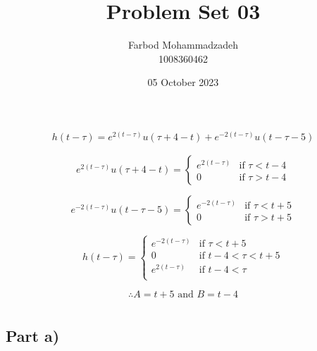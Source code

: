 \documentclass[20pt]{article}
\title{Problem Set 03}
\author{Farbod Mohammadzadeh\\
    1008360462}
\date{05 October 2023}
\begin{document}
\Large


\maketitle

\newpage

\section{}

\begin{align}
    h(t-\tau) = e^{2(t-\tau)} u(\tau+4-t) + e^{-2(t-\tau)} u(t-\tau - 5)
\end{align}

\begin{equation}
    e^{2(t-\tau)}u(\tau+4-t)=
    \begin{cases}
        e^{2(t-\tau)} & \text{if } \tau < t-4 \\
        0             & \text{if } \tau > t-4
    \end{cases}
\end{equation}

\begin{equation}
    e^{-2(t-\tau)}u(t-\tau - 5)=
    \begin{cases}
        e^{-2(t-\tau)} & \text{if } \tau < t+5 \\
        0              & \text{if } \tau > t+5
    \end{cases}
\end{equation}

\begin{equation}
    h(t-\tau)=
    \begin{cases}
        e^{-2(t-\tau)} & \text{if } \tau < t+5        \\
        0              & \text{if }  t-4 < \tau < t+5 \\
        e^{2(t-\tau)}  & \text{if }  t-4 < \tau       \\
    \end{cases}
\end{equation}

\[ \therefore A = t+5 \text{ and }B = t-4 \]

\section{}

\subsection*{Part a)}
\end{document}
